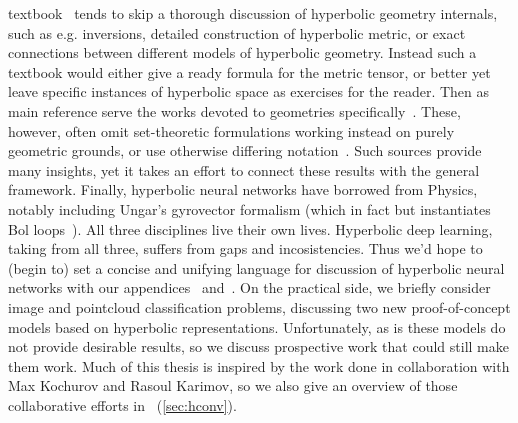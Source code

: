 textbook~\cite{leeRiem,leeSmooth} tends to skip a thorough discussion of
hyperbolic geometry internals, such as e.g. inversions, detailed
construction of hyperbolic metric, or exact connections between different
models of hyperbolic geometry. Instead such a textbook would either give a
ready formula for the metric tensor, or better yet leave specific instances of
hyperbolic space as exercises for the reader. Then as main reference serve the
works devoted to geometries specifically~\cite{thurstonThree}.
These, however, often omit set-theoretic formulations working instead on purely
geometric grounds, or use otherwise differing
notation~\cite{beardonGeometryDiscrete}. Such sources provide many insights,
yet it takes an effort to connect these results with the general framework.
Finally, hyperbolic neural networks have borrowed from Physics, notably
including Ungar's gyrovector formalism (which in fact but instantiates Bol
loops~\cite{sabinin1995gyrogroups}).  All three disciplines live their own
lives. Hyperbolic deep learning, taking from all three, suffers from gaps and
incosistencies. Thus we'd hope to (begin to) set a concise and unifying
language for discussion of hyperbolic neural networks with our
appendices~ and~.  On
the practical side, we briefly consider image and pointcloud classification
problems, discussing two new proof-of-concept models based on hyperbolic
representations.  Unfortunately, as is these models do not provide desirable
results, so we discuss prospective work that could still make them work.  Much
of this thesis is inspired by the work done in collaboration with Max Kochurov
and Rasoul Karimov, so we also give an overview of those collaborative efforts
in ~(\autoref{sec:hconv}).
